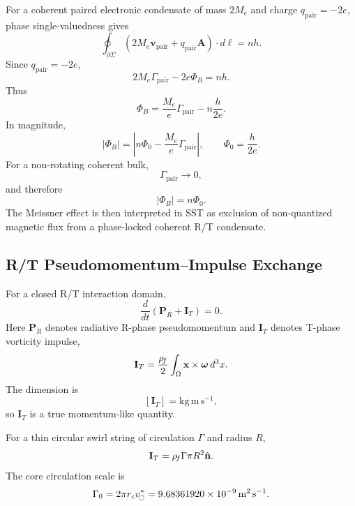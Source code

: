         For a coherent paired electronic condensate of mass \(2M_e\) and charge
        \(q_{\mathrm{pair}}=-2e\), phase single-valuedness gives
        \[
            \oint_{\partial\Sigma}
            \left(
                2M_e\mathbf v_{\mathrm{pair}}
                +
                q_{\mathrm{pair}}\mathbf A
            \right)\cdot d\boldsymbol\ell
            =
            nh .
        \]
        Since \(q_{\mathrm{pair}}=-2e\),
        \[
            2M_e\Gamma_{\mathrm{pair}}
            -
            2e\Phi_B
            =
            nh .
        \]
        Thus
        \[
            \Phi_B
            =
            \frac{M_e}{e}\Gamma_{\mathrm{pair}}
            -
            n\frac{h}{2e}.
        \]
        In magnitude,
        \[
            |\Phi_B|
            =
            \left|
                n\Phi_0
            -
                \frac{M_e}{e}\Gamma_{\mathrm{pair}}
            \right|,
            \qquad
            \Phi_0=\frac{h}{2e}.
        \]
        For a non-rotating coherent bulk,
        \[
            \Gamma_{\mathrm{pair}}\to 0,
        \]
        and therefore
        \[
            |\Phi_B|=n\Phi_0.
        \]
        The Meissner effect is then interpreted in SST as exclusion of non-quantized
        magnetic flux from a phase-locked coherent R/T condensate.
    
    \subsection{R/T Pseudomomentum--Impulse Exchange}
        
        For a closed R/T interaction domain,
        \[
            \frac{d}{dt}
            \left(
                \mathbf P_R+\mathbf I_T
            \right)
            =
            0.
        \]
        Here \(\mathbf P_R\) denotes radiative R-phase pseudomomentum and
        \(\mathbf I_T\) denotes T-phase vorticity impulse,
        \[
            \mathbf I_T
            =
            \frac{\rho_{\!f}}{2}
            \int_{\Omega}
            \mathbf x\times\boldsymbol\omega\,d^3x .
        \]
        The dimension is
        \[
            [\mathbf I_T]
            =
            \mathrm{kg\,m\,s^{-1}},
        \]
        so \(\mathbf I_T\) is a true momentum-like quantity.
        
        For a thin circular swirl string of circulation \(\Gamma\) and radius \(R\),
        \[
            \mathbf I_T
            =
            \rho_{\!f}\Gamma\pi R^2\hat{\mathbf n}.
        \]
        The core circulation scale is
        \[
            \Gamma_0
            =
            2\pi r_cv_{\!\boldsymbol{\circlearrowleft}}^{\ast}
            =
            9.68361920\times10^{-9}\,\mathrm{m^2\,s^{-1}}.
        \]
    
